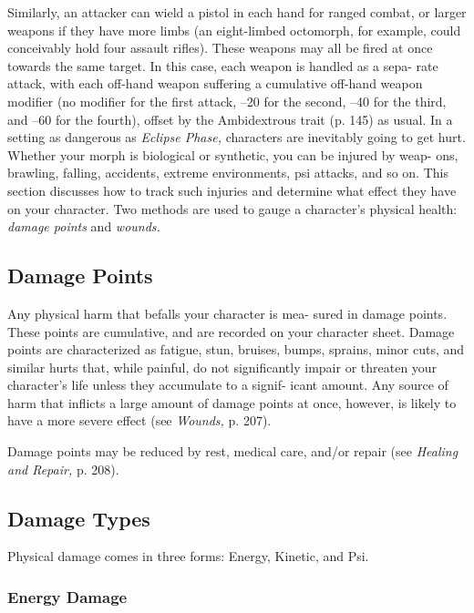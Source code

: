 Similarly, an attacker can wield a pistol in each hand 
for ranged combat, or larger weapons if they have 
more limbs (an eight-limbed octomorph, for example, 
could conceivably hold four assault rifles).  These 
weapons may all be fired at once towards the same 
target. In this case, each weapon is handled as a sepa-
rate attack, with each off-hand weapon suffering a 
cumulative off-hand weapon modifier (no modifier for 
the first attack, –20 for the second, –40 for the third, 
and –60 for the fourth), offset by the Ambidextrous 
trait (p. 145) as usual.
In a setting as dangerous as \textit{Eclipse Phase,} characters 
are inevitably going to get hurt. Whether your morph 
is biological or synthetic, you can be injured by weap-
ons, brawling, falling, accidents, extreme environments, 
psi attacks, and so on. This section discusses how to 
track such injuries and determine what effect they have 
on your character. Two methods are used to gauge a 
character's physical health: \textit{damage points} and \textit{wounds.}

\subsection{Damage Points}

Any physical harm that befalls your character is mea-
sured in damage points. These points are cumulative, 
and are recorded on your character sheet. Damage 
points are characterized as fatigue, stun, bruises, 
bumps, sprains, minor cuts, and similar hurts that, 
while painful, do not significantly impair or threaten 
your character's life unless they accumulate to a signif-
icant amount. Any source of harm that inflicts a large 
amount of damage points at once, however, is likely to 
have a more severe effect (see \textit{Wounds,} p. 207).

Damage points may be reduced by rest, medical 
care, and/or repair (see \textit{Healing and Repair,} p. 208).

\subsection{Damage Types}

Physical damage comes in three forms: Energy, Kinetic, 
and Psi.

\subsubsection{Energy Damage}

